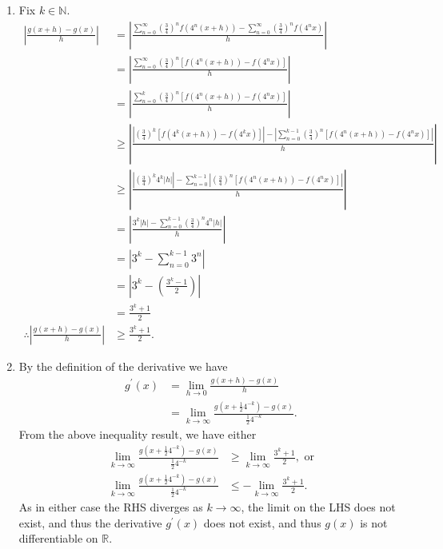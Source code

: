 \documentclass[a4paper,11pt]{article}
\newcommand{\ds}{\displaystyle}
\begin{document}
{{\begin{enumerate}[leftmargin=*]
\begin{enumerate}[label=\roman*)]
			\item Fix $\ds{k \in \mathbb{N}}$. 
				\begin{align*}
					\left|\frac{g(x+h) - g(x)}{h}\right| & = \left|\frac{\sum_{n=0}^{\infty} \left(\frac{3}{4}\right)^n f(4^n(x+h)) - \sum_{n=0}^{\infty} \left(\frac{3}{4}\right)^n f(4^nx)}{h}\right| \\
														 & = \left|\frac{\sum_{n=0}^{\infty} \left(\frac{3}{4}\right)^n \left[f(4^n(x+h)) - f(4^nx)\right]}{h}\right| \\
														 & = \left|\frac{\sum_{n=0}^{k} \left(\frac{3}{4}\right)^n \left[f(4^n(x+h)) - f(4^nx)\right]}{h}\right| \\
														 & \geq \left|\frac{\left|\left(\frac{3}{4}\right)^k \left[f(4^k(x+h)) - f(4^kx)\right]\right| - \left|\sum_{n=0}^{k-1} \left(\frac{3}{4}\right)^n \left[f(4^n(x+h)) - f(4^nx)\right]\right|}{h}\right| \\
														 & \geq \left|\frac{\left|\left(\frac{3}{4}\right)^k 4^k|h|\right| - \sum_{n=0}^{k-1}\left| \left(\frac{3}{4}\right)^n \left[f(4^n(x+h)) - f(4^nx)\right]\right|}{h}\right| \\
														 & = \left|\frac{3^k |h| - \sum_{n=0}^{k-1} \left(\frac{3}{4}\right)^n 4^n|h|}{h}\right| \\
														 & = \left|3^k - \sum_{n=0}^{k-1} 3^n\right| \\
														 & = \left|3^k - \left(\frac{3^k-1}{2}\right)\right| \\
														 & = \frac{3^k+1}{2} \\
					\therefore \left|\frac{g(x+h) - g(x)}{h}\right| & \geq \frac{3^k+1}{2}.
				\end{align*}

			\item By the definition of the derivative we have 
				\begin{align*}
					g^{\prime}(x) & = \lim_{h\rightarrow 0} \frac{g(x+h) - g(x)}{h} \\
								  & = \lim_{k\rightarrow \infty} \frac{g\left(x+\tfrac{1}{2}4^{-k}\right) - g(x)}{\tfrac{1}{2}4^{-k}}.
				\end{align*}
				From the above inequality result, we have either 
				\begin{align*}
					\lim_{k\rightarrow \infty} \frac{g\left(x+\tfrac{1}{2}4^{-k}\right) - g(x)}{\tfrac{1}{2}4^{-k}} & \geq \lim_{k \rightarrow \infty} \frac{3^k+1}{2}, \text{ or} \\
					\lim_{k\rightarrow \infty} \frac{g\left(x+\tfrac{1}{2}4^{-k}\right) - g(x)}{\tfrac{1}{2}4^{-k}} & \leq -\lim_{k \rightarrow \infty} \frac{3^k+1}{2}.
				\end{align*}
				As in either case the RHS diverges as $\ds{k \rightarrow \infty}$, the limit on the LHS does not exist, and thus the derivative $\ds{g^{\prime}(x)}$ does not exist, and thus $\ds{g(x)}$ is not differentiable on $\ds{\mathbb{R}}$.



\end{enumerate}
\end{enumerate}}}
\end{document}
